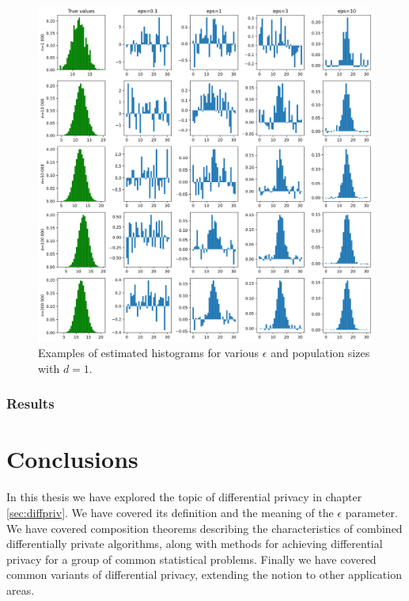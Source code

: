 \documentclass[12pt]{article}
\begin{document}
\begin{description}
    \begin{figure}
        \centering
        \includegraphics[width=\textwidth]{imgs/histogram_matrix.png}
        \caption{Examples of estimated histograms for various $\epsilon$ and population sizes with $d=1$.}
        \label{fig:histogram_matrix}
    \end{figure}
\end{description}

\subsubsection{Results}

\section{Conclusions}

In this thesis we have explored the topic of differential privacy in chapter \ref{sec:diffpriv}. We have covered its definition and the meaning of the $\epsilon$ parameter. We have covered composition theorems describing the characteristics of combined differentially private algorithms, along with methods for achieving differential privacy for a group of common statistical problems. Finally we have covered common variants of differential privacy, extending the notion to other application areas.
\end{document}
